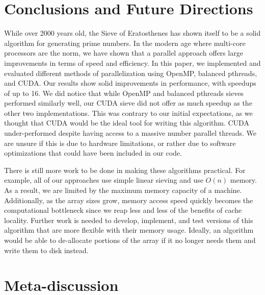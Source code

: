\documentclass[11pt,twocolumn]{article}
\begin{document}
\section{Conclusions and Future Directions}\label{conc} 
While over 2000 years old, the Sieve of Eratosthenes has shown itself to be
a solid algorithm for generating prime numbers. In the modern age where multi-core 
processors are the norm, we have shown that a parallel approach offers large
improvements
in terms of speed and efficiency. In this paper, we implemented and evaluated
different
methods of parallelization using OpenMP, balanced pthreads, and CUDA.
Our results show solid improvements in performance, with speedups of up to
16. We did notice that while OpenMP and balanced pthreads sieves performed 
similarly well, our CUDA sieve did not offer as much speedup as the other two
implementations. This was contrary
to our initial expectations, as we thought that CUDA would be the
ideal tool for writing this algorithm. CUDA under-performed despite having
access to a massive number parallel threads. We are unsure if this is due
to hardware limitations, or rather due to
software optimizations that could have been included in our code.

There is still more work to be done in making these algorithms practical. For example, 
all of our approaches use simple linear sieving and use
$O(n)$ memory. As a result, we are limited by the maximum
memory capacity of a machine. Additionally, as the array sizes grow, 
memory access speed quickly becomes the computational bottleneck since we reap
less and less of the benefits of cache locality. Further work is needed to
develop, implement, and test versions of this algorithm that are more flexible
with their memory usage. Ideally, an algorithm would be able to de-allocate portions
of the array if it no longer needs them and write them to disk instead.

\section{Meta-discussion}\label{meta} 
\end{document}
